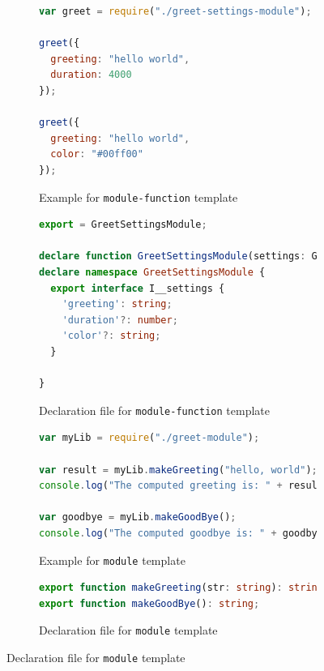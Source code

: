 \documentclass[english,cleveref,autoref,submission]{programming}
\begin{document}
\begin{figure}[tp]
  \centering
  \begin{subfigure}{0.48\linewidth}
    \begin{lstlisting}[language=JavaScript,numbers=none]
var greet = require("./greet-settings-module");

greet({
  greeting: "hello world",
  duration: 4000
});

greet({
  greeting: "hello world",
  color: "#00ff00"
});
    \end{lstlisting}
    \caption{Example for \texttt{module-function} template}
    \label{fig:example-module-function}
  \end{subfigure}
  \hfill
  \begin{subfigure}{0.48\linewidth}
    \begin{lstlisting}[language=TypeScript,numbers=none]
export = GreetSettingsModule;

declare function GreetSettingsModule(settings: GreetSettingsModule.I__settings): void;
declare namespace GreetSettingsModule {
  export interface I__settings {
    'greeting': string;
    'duration'?: number;
    'color'?: string;
  }

}
    \end{lstlisting}
    \caption{Declaration file for \texttt{module-function} template}
    \label{fig:template-module-function}
  \end{subfigure}

  \begin{subfigure}{0.48\linewidth}
      \begin{lstlisting}[language=JavaScript,numbers=none]
var myLib = require("./greet-module");

var result = myLib.makeGreeting("hello, world");
console.log("The computed greeting is: " + result);

var goodbye = myLib.makeGoodBye();
console.log("The computed goodbye is: " + goodbye);    
      \end{lstlisting}
    \caption{Example for \texttt{module} template}
    \label{fig:example-module}
    \end{subfigure}
    \hfill
    \begin{subfigure}{0.48\linewidth}
      \begin{lstlisting}[language=TypeScript,numbers=none]
export function makeGreeting(str: string): string;
export function makeGoodBye(): string;        
      \end{lstlisting}
      \caption{Declaration file for \texttt{module} template}
      \label{fig:template-module}
    \end{subfigure}


\end{figure}
\end{document}
